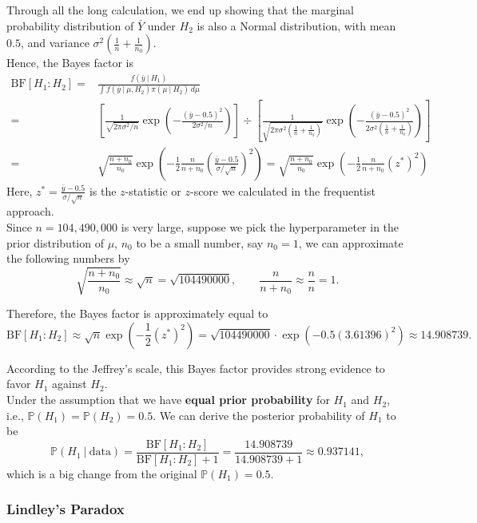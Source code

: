 \documentclass{article}
\def\dsst{\displaystyle}
\begin{document}
Through all the long calculation, we end up showing that the marginal probability distribution of $\bar{Y}$ under $H_2$ is also a Normal distribution, with mean $0.5$, and variance $\dsst \sigma^2\left(\frac{1}{n}+\frac{1}{n_0}\right)$. \\

Hence, the Bayes factor is
\begin{align*} 
\text{BF}[H_1:H_2] = & \frac{f(\bar{y}~|~H_1)}{\dsst \int f(\bar{y}~|~\mu, H_2)\pi(\mu~|~H_2)\, d\mu} \\
= & \left[\frac{1}{\sqrt{2\pi\sigma^2/n}}\exp\left(-\frac{(\bar{y}-0.5)^2}{2\sigma^2/n}\right)\right] \div \left[\frac{1}{\sqrt{2\pi\sigma^2\left(\frac{1}{n}+\frac{1}{n_0}\right)}}\exp\left(-\frac{(\bar{y}-0.5)^2}{2\sigma^2\left(\frac{1}{n}+\frac{1}{n_0}\right)}\right)\right] \\
= & \sqrt{\frac{n+n_0}{n_0}}\exp\left(-\frac{1}{2}\frac{n}{n+n_0}\left(\frac{\bar{y}-0.5}{\sigma/\sqrt{n}}\right)^2\right) = \sqrt{\frac{n+n_0}{n_0}}\exp\left(-\frac{1}{2}\frac{n}{n+n_0}(z^*)^2\right)
\end{align*}
Here, $z^* = \dsst \frac{\bar{y}-0.5}{\sigma/\sqrt{n}}$ is the $z$-statistic or $z$-score we calculated in the frequentist approach.\\

Since $n = 104,490,000$ is very large, suppose we pick the hyperparameter in the prior distribution of $\mu$, $n_0$ to be a small number, say $n_0 = 1$, we can approximate the following numbers by
$$ \sqrt{\frac{n+n_0}{n_0}}\approx \sqrt{n} = \sqrt{104490000},\qquad \frac{n}{n+n_0}\approx \frac{n}{n} = 1. $$

Therefore, the Bayes factor is approximately equal to
$$ \text{BF}[H_1:H_2] \approx \sqrt{n}\exp\left(-\frac{1}{2}(z^*)^2\right) = \sqrt{104490000}\cdot\exp\left(-0.5(3.61396)^2\right) \approx 14.908739. $$

According to the Jeffrey's scale, this Bayes factor provides strong evidence to favor $H_1$ against $H_2$. \\

Under the assumption that we have \textbf{equal prior probability} for $H_1$ and $H_2$, i.e., $\mathbb{P}(H_1) = \mathbb{P}(H_2) = 0.5$. We can derive the posterior probability of $H_1$ to be
$$ \mathbb{P}(H_1~|~\text{data}) = \frac{\text{BF}[H_1:H_2]}{\text{BF}[H_1:H_2]+1}  = \frac{14.908739}{14.908739 + 1} \approx 0.937141, $$
which is a big change from the original $\mathbb{P}(H_1) = 0.5$. 

\subsubsection*{Lindley's Paradox}
\end{document}
